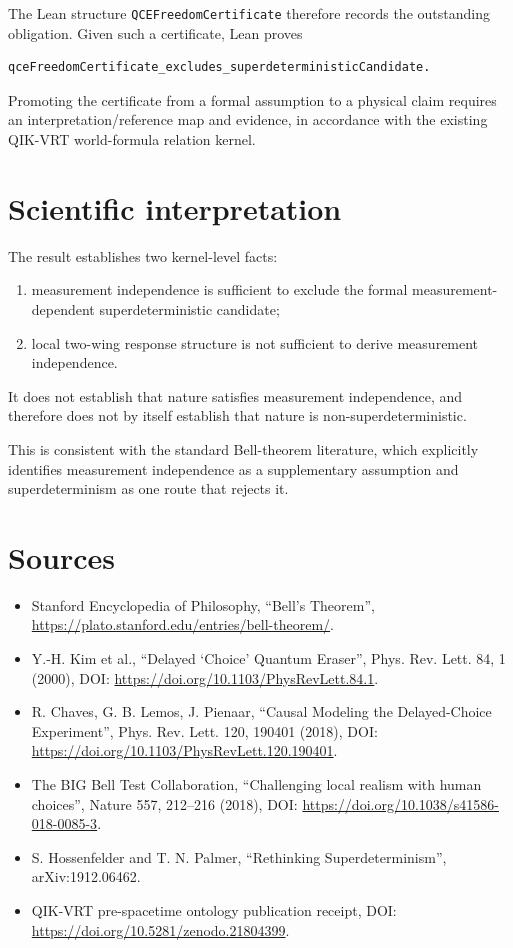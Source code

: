 \documentclass[11pt,a4paper]{article}
\begin{document}
The Lean structure \texttt{QCEFreedomCertificate} therefore records the outstanding obligation.  Given such a certificate, Lean proves
\begin{verbatim}
qceFreedomCertificate_excludes_superdeterministicCandidate.
\end{verbatim}
Promoting the certificate from a formal assumption to a physical claim requires an interpretation/reference map and evidence, in accordance with the existing QIK-VRT world-formula relation kernel.

\section{Scientific interpretation}
The result establishes two kernel-level facts:
\begin{enumerate}
\item measurement independence is sufficient to exclude the formal measurement-dependent superdeterministic candidate;
\item local two-wing response structure is not sufficient to derive measurement independence.
\end{enumerate}
It does not establish that nature satisfies measurement independence, and therefore does not by itself establish that nature is non-superdeterministic.

This is consistent with the standard Bell-theorem literature, which explicitly identifies measurement independence as a supplementary assumption and superdeterminism as one route that rejects it.

\section{Sources}
\begin{itemize}
\item Stanford Encyclopedia of Philosophy, ``Bell's Theorem'', \url{https://plato.stanford.edu/entries/bell-theorem/}.
\item Y.-H. Kim et al., ``Delayed `Choice' Quantum Eraser'', Phys. Rev. Lett. 84, 1 (2000), DOI: \url{https://doi.org/10.1103/PhysRevLett.84.1}.
\item R. Chaves, G. B. Lemos, J. Pienaar, ``Causal Modeling the Delayed-Choice Experiment'', Phys. Rev. Lett. 120, 190401 (2018), DOI: \url{https://doi.org/10.1103/PhysRevLett.120.190401}.
\item The BIG Bell Test Collaboration, ``Challenging local realism with human choices'', Nature 557, 212--216 (2018), DOI: \url{https://doi.org/10.1038/s41586-018-0085-3}.
\item S. Hossenfelder and T. N. Palmer, ``Rethinking Superdeterminism'', arXiv:1912.06462.
\item QIK-VRT pre-spacetime ontology publication receipt, DOI: \url{https://doi.org/10.5281/zenodo.21804399}.
\end{itemize}
\end{document}
